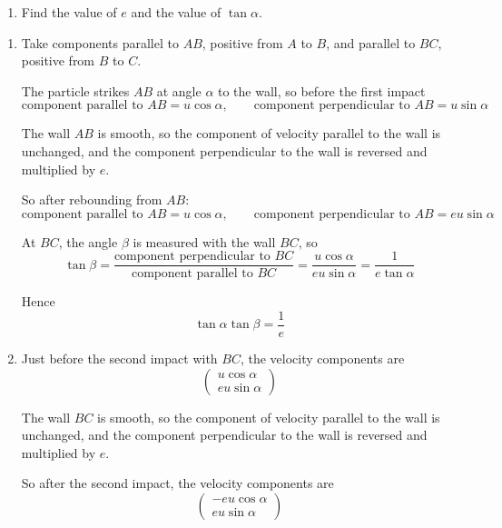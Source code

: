 \documentclass[leqno]{article}
\begin{document}
\begin{enumerate}[
  label=\textbf{\arabic*.},
  leftmargin=*,
  topsep=0pt,
  partopsep=0pt,
  parsep=0pt
]
\begin{enumerate}[label=\textbf{(\alph*)}, resume]
  \item Find the value of $e$ and the value of $\tan \alpha$.  \\
\end{enumerate}

\vspace*{10pt}

\begin{djsSolution}
\begin{enumerate}[label=\textbf{(\alph*)}]
  \item Take components parallel to $AB$, positive from $A$ to $B$, and parallel to $BC$, positive from $B$ to $C$.

  The particle strikes $AB$ at angle $\alpha$ to the wall, so before the first impact
  \[
  \text{component parallel to }AB=u\cos\alpha,\qquad
  \text{component perpendicular to }AB=u\sin\alpha
  \]

  The wall $AB$ is smooth, so the component of velocity parallel to the wall is unchanged, and the component perpendicular to the wall is reversed and multiplied by $e$.

  So after rebounding from $AB$:
  \[
  \text{component parallel to }AB=u\cos\alpha,\qquad
  \text{component perpendicular to }AB=eu\sin\alpha
  \]

  At $BC$, the angle $\beta$ is measured with the wall $BC$, so
  \[
  \tan\beta=\frac{\text{component perpendicular to }BC}{\text{component parallel to }BC}
  =\frac{u\cos\alpha}{eu\sin\alpha}
  =\frac{1}{e\tan\alpha}
  \]

  Hence
  \[
  \tan\alpha\tan\beta=\frac{1}{e}
  \]

  \item Just before the second impact with $BC$, the velocity components are
  \[
  \begin{pmatrix}u\cos\alpha\\eu\sin\alpha\end{pmatrix}
  \]

  The wall $BC$ is smooth, so the component of velocity parallel to the wall is unchanged, and the component perpendicular to the wall is reversed and multiplied by $e$.

  So after the second impact, the velocity components are
  \[
  \begin{pmatrix}-eu\cos\alpha\\eu\sin\alpha\end{pmatrix}
  \]


\end{enumerate}
\end{djsSolution}
\end{enumerate}
\end{document}
